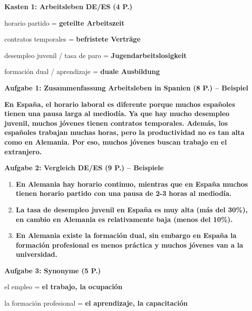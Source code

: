 \documentclass[11pt,a4paper]{article}
\newcommand{\lsg}[1]{\textcolor{loesung}{\textbf{#1}}}
\begin{document}
\begin{gruppeBbox}

\textbf{Kasten 1: Arbeitsleben DE/ES (4 P.)}

horario partido = \lsg{geteilte Arbeitszeit}

contratos temporales = \lsg{befristete Verträge}

desempleo juvenil / tasa de paro = \lsg{Jugendarbeitslosigkeit}

formación dual / aprendizaje = \lsg{duale Ausbildung}

\vspace{0.5em}

\textbf{Aufgabe 1: Zusammenfassung Arbeitsleben in Spanien (8 P.) -- Beispiel}

\lsg{En España, el horario laboral es diferente porque muchos españoles tienen una pausa larga al mediodía. Ya que hay mucho desempleo juvenil, muchos jóvenes tienen contratos temporales. Además, los españoles trabajan muchas horas, pero la productividad no es tan alta como en Alemania. Por eso, muchos jóvenes buscan trabajo en el extranjero.}

\vspace{0.5em}

\textbf{Aufgabe 2: Vergleich DE/ES (9 P.) -- Beispiele}
\begin{enumerate}[leftmargin=2em, nosep]
    \item \lsg{En Alemania hay horario continuo, mientras que en España muchos tienen horario partido con una pausa de 2-3 horas al mediodía.}
    \item \lsg{La tasa de desempleo juvenil en España es muy alta (más del 30\%), en cambio en Alemania es relativamente baja (menos del 10\%).}
    \item \lsg{En Alemania existe la formación dual, sin embargo en España la formación profesional es menos práctica y muchos jóvenes van a la universidad.}
\end{enumerate}

\vspace{0.5em}

\textbf{Aufgabe 3: Synonyme (5 P.)}

el empleo = \lsg{el trabajo, la ocupación}

la formación profesional = \lsg{el aprendizaje, la capacitación}


\end{gruppeBbox}
\end{document}
